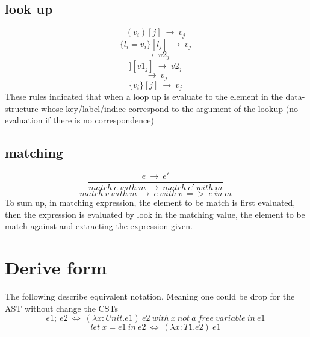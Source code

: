 \documentclass[10pt,a4paper]{article}
\begin{document}
\subsection*{ look up }
\begin{equation}(v_i)[j]     \ \rightarrow \ v_j\ \tag{\ E-LUPTUPLE\ }\end{equation} 
\begin{equation}\{l_i=v_i\}[l_j] \ \rightarrow \ v_j\ \tag{\ E-LUPRECORD\ }\end{equation}
\begin{equation}[v1_i=v2_i][v1_j] \ \rightarrow \ v2_j\ \tag{\ E-LUPMAP\ }\end{equation}
\begin{equation}[[v2_i=v2_i]][v1_j] \ \rightarrow \ v2_j\ \tag{\ E-LUPBIGMAP\ }\end{equation}
\begin{equation}[v_i][j]     \ \rightarrow \ v_j\ \tag{\ E-LUPLIST\ }\end{equation}
\begin{equation}\{v_i\}[j]     \ \rightarrow \ v_j\ \tag{\ E-LUPSET\ }\end{equation}
These rules indicated that when a loop up is evaluate to the element in the data-structure whose key/label/indice correspond to the argument of the lookup
(no evaluation if there is no correspondence)

\subsection*{ matching }
\begin{equation}\frac{e\ \rightarrow \ e'}{match\ e\ with\ m\ \rightarrow \ match\ e'\ with\ m}\ \tag{\ E-MATCH1\ }\end{equation}
\begin{equation}match\ v\ with\ m\ \rightarrow \ e\ with\ v\ =>\ e\ in\ m\ \tag{\ E-MATCH2\ }\end{equation}
To sum up, in matching expression, the element to be match is first evaluated, then
the expression is evaluated by look in the matching value, the element to be match against and extracting the expression given. 



\section*{ Derive form }
The following describe equivalent notation. Meaning one could be drop for the AST without change the CSTs
\begin{equation*}e1;\ e2\ \iff \ (\lambda x:Unit.e1)\ e2\ with\ x\ not\ a\ free\ variable\ in\ e1 \ \end{equation*}
\begin{equation*}let\ x=e1\ in\ e2\ \iff\ (\lambda x:T1.e2)\ e1 \ \end{equation*}
\end{document}
